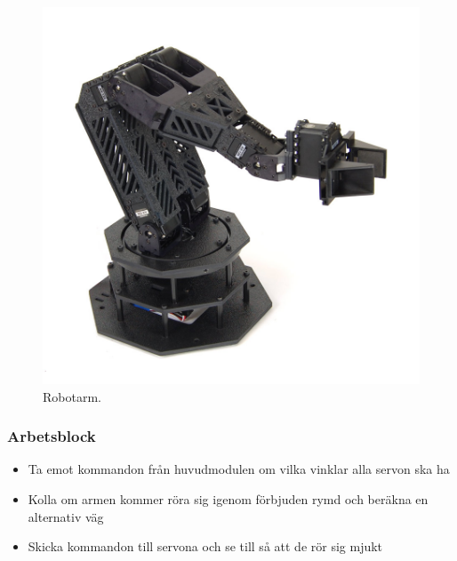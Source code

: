 \begin{figure}[h]
\center
\includegraphics[scale=0.35]{grafik/motor-arm}
\caption{Robotarm.}
\end{figure}

\subsubsection{Arbetsblock}

\begin{itemize}
\item Ta emot kommandon från huvudmodulen om vilka vinklar alla servon ska ha
\item Kolla om armen kommer röra sig igenom förbjuden rymd och beräkna en alternativ väg
\item Skicka kommandon till servona och se till så att de rör sig mjukt
\end{itemize}
